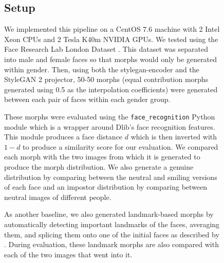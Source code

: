 \documentclass[12pt]{article}
\begin{document}
\begin{figure}[t]
\subsection{Setup}
\par
We implemented this pipeline on a CentOS 7.6 machine with 2 Intel Xeon CPUs and 2 Tesla K40m NVIDIA GPUs. We tested using the Face Research Lab London Dataset \cite{london}. This dataset was separated into male and female faces so that morphs would only be generated within gender. Then, using both the stylegan-encoder and the StyleGAN 2 projector, 50-50 morphs (equal contribution morphs generated using 0.5 as the interpolation coefficients) were generated between each pair of faces within each gender group.
\par
These morphs were evaluated using the \texttt{face\_recognition} Python module which is a wrapper around Dlib's face recognition features. This module produces a face distance $d$ which is then inverted with $1-d$ to produce a similarity score for our evaluation. We compared each morph with the two images from which it is generated to produce the morph distribution. We also generate a genuine distribution by comparing between the neutral and smiling versions of each face and an impostor distribution by comparing between neutral images of different people.
\par
As another baseline, we also generated landmark-based morphs by automatically detecting important landmarks of the faces, averaging them, and splicing them onto one of the initial faces as described by \cite{visapp17}. During evaluation, these landmark morphs are also compared with each of the two images that went into it.


\end{figure}
\end{document}
